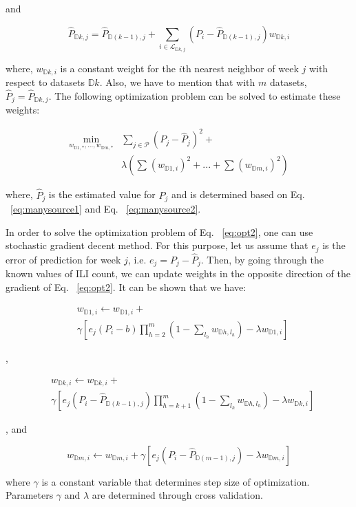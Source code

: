 and

\begin{equation}
\hat{P}_{\mathbb{D}k,j} = \hat{P}_{\mathbb{D}(k-1),j} + \sum_{i \in \mathcal{L}_{\mathbb{D}k,j}}{} (P_i - \hat{P}_{\mathbb{D}(k-1),j} )w_{\mathbb{D}k,i} 
\label{eq:manysource2}
\end{equation}

where, $w_{\mathbb{D}k,i}$ is a constant weight for the $i$th nearest neighbor of week $j$ with respect to datasets $\mathbb{D}k$. Also, we have to mention that with $m$ datasets, $\hat{P}_j = \hat{P}_{\mathbb{D}k,j}$. The following optimization problem can be solved to estimate these weights:

\begin{equation}
\begin{array}{ll}
\min_{w_{\mathbb{D}1,*}, ... ,w_{\mathbb{D}m,*}} & \sum_{j \in \mathcal{P}} {(P_j - \hat{P}_j)^2} +
\\ 
& \lambda (\sum_{}{}{{(w_{\mathbb{D}1,i})}^2}+...+\sum_{}{}{{(w_{\mathbb{D}m,i})}^2})
\end{array}
\label{eq:opt2}
\end{equation}

where, $\hat{P}_j$ is the estimated value for $P_j$ and is determined based on Eq. ~\ref{eq:manysource1} and Eq. ~\ref{eq:manysource2}.

In order to solve the optimization problem of Eq. ~\ref{eq:opt2}, one can use stochastic gradient decent method. For this purpose, let us assume that $e_j$ is the error of prediction for week $j$, i.e. $e_j = P_j - \hat{P}_j$. Then, by going through the known values of ILI count, we can update weights in the opposite direction of the gradient of Eq. ~\ref{eq:opt2}. It can be shown that we have:

\begin{equation}
\begin{array}{ll}
& w_{\mathbb{D}1,i} \leftarrow w_{\mathbb{D}1,i}+ \\
& \gamma \left [e_j(P_i - b)\prod_{h=2}^{m} (1- \sum_{l_h}w_{\mathbb{D}h,l_h})   - \lambda w_{\mathbb{D}1,i}  \right ]
\end{array}
\end{equation}

, 

\begin{equation}
\begin{array}{ll}
& w_{\mathbb{D}k,i}  \leftarrow w_{\mathbb{D}k,i}+ \\
& \gamma \left [e_j(P_i - \hat{P}_{\mathbb{D}(k-1),j})\prod_{h=k+1}^{m} (1- \sum_{l_h}w_{\mathbb{D}h,l_h})   - \lambda w_{\mathbb{D}k,i}  \right ]
\end{array}
\end{equation}

, and

\begin{equation}
w_{\mathbb{D}m,i} \leftarrow w_{\mathbb{D}m,i}+ \gamma \left [e_j(P_i - \hat{P}_{\mathbb{D}(m-1),j}) - \lambda w_{\mathbb{D}m,i}  \right ]
\end{equation}

where $\gamma$ is a constant variable that determines step size of optimization. Parameters $\gamma$ and $\lambda$ are determined through cross validation.
